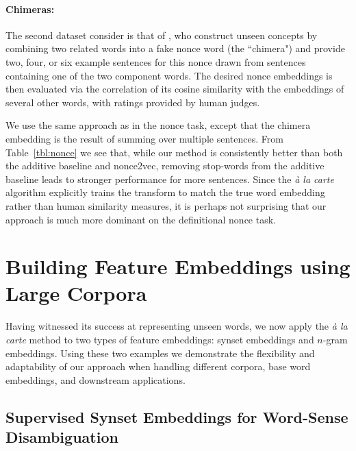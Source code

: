 \documentclass[11pt,a4paper]{article}
\begin{document}
\paragraph{Chimeras:} 
The second dataset \citet{Herbelot:17} consider is that of \citet{Lazaridou:17}, who construct unseen concepts by combining two related words into a fake nonce word (the ``chimera") and provide two, four, or six example sentences for this nonce drawn from sentences containing one of the two component words. 
The desired nonce embeddings is then evaluated via the correlation of its cosine similarity with the embeddings of several other words, with ratings provided by human judges.

We use the same approach as in the nonce task, except that the chimera embedding is the result of summing over multiple sentences.
From Table~\ref{tbl:nonce} we see that, while our method is consistently better than both the additive baseline and nonce2vec, removing stop-words from the additive baseline leads to stronger performance for more sentences.
Since the {\em\`a la carte} algorithm explicitly trains the transform to match the true word embedding rather than human similarity measures, it is perhaps not surprising that our approach is much more dominant on the definitional nonce task. 


\section{Building Feature Embeddings using Large Corpora}

Having witnessed its success at representing unseen words, we now apply the {\em\`a la carte} method to two types of feature embeddings: synset embeddings and $n$-gram embeddings.
Using these two examples we demonstrate the flexibility and adaptability of our approach when handling different corpora, base word embeddings, and downstream applications.

\subsection{Supervised Synset Embeddings for Word-Sense Disambiguation}\label{subsec:wsd}
\end{document}
